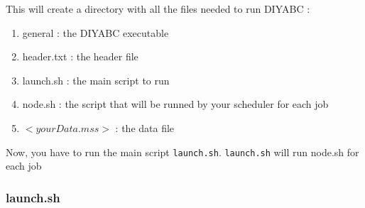  This will create a directory with all the files needed to run DIYABC :
\begin{enumerate}
    \item \textsf{general} : the DIYABC executable
    \item \textsf{header.txt} : the header file
    \item \textsf{launch.sh} : the main script to run
    \item \textsf{node.sh} : the script that will be runned by your scheduler for each job
    \item \textsf{$<yourData.mss>$} : the data file 
\end{enumerate}
Now, you have to run the main script \texttt{launch.sh}. \texttt{launch.sh} will run node.sh for each job

\subsubsection{launch.sh}


